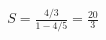 \documentclass[preview]{standalone}
\begin{document}
\begin{align*}
S = \frac{4/3}{1 - 4/5} = \frac{20}{3}
\end{align*}
\end{document}
